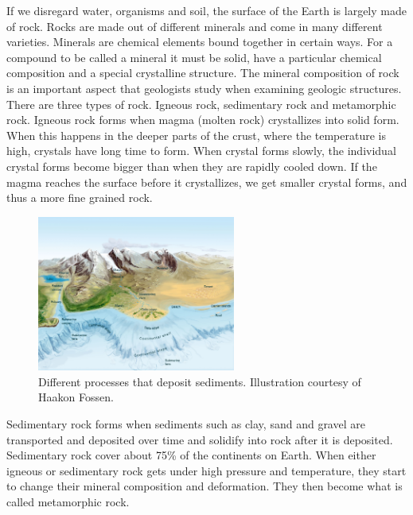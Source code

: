 \documentclass[a4paper,12pt]{report}
\begin{document}
If we disregard water, organisms and soil, the surface of the Earth is largely made of rock. Rocks are made out of different minerals and come in many different varieties. Minerals are chemical elements bound together in certain ways. For a compound to be called a mineral it must be solid, have a particular chemical composition and a special crystalline structure. The mineral composition of rock is an important aspect that geologists study when examining geologic structures. 
There are three types of rock. Igneous rock, sedimentary rock and metamorphic rock. Igneous rock forms when magma (molten rock) crystallizes into solid form. When this happens in the deeper parts of the crust, where the temperature is high, crystals have long time to form. When crystal forms slowly, the individual crystal forms become bigger than when they are rapidly cooled down. 
If the magma reaches the surface before it crystallizes, we get smaller crystal forms, and thus a more fine grained rock. 
\begin{figure}
  \begin{center}
    \includegraphics[width=0.58\textwidth]{thesis/geo/english/geoDeposits.jpg}
  \end{center}
  \caption{Different processes that deposit sediments. Illustration courtesy of Haakon Fossen.}
  \label{fig:geoDeposit}
\end{figure}
Sedimentary rock forms when sediments such as clay, sand 
and gravel are transported and deposited over time and solidify into rock after it is deposited. Sedimentary rock cover about 75\% of the continents on Earth. When either igneous or sedimentary rock gets under high pressure and temperature, they start to change their mineral composition and deformation. They then become what is called metamorphic rock.
\end{document}
